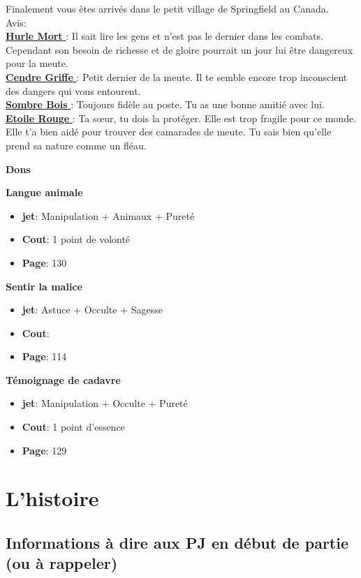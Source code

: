 \documentclass[oneside,12pt]{book}
\newcommand\don[5]{
\textbf{#1} \\
#2
\begin{itemize}
\item{ \textbf{jet}: #3}
\item{ \textbf{Cout}: #4}
\item{ \textbf{Page}: #5}
\end{itemize}
\vspace{0.5cm}
}
\newcommand{\Lynn}{\textbf{Etoile Rouge} }
\newcommand{\Luke}{\textbf{Cendre Griffe} }
\newcommand{\Peter}{\textbf{Hurle Mort} }
\newcommand{\Leonard}{\textbf{Sombre Bois} }
\begin{document}
\begin{flushleft}
\begin{description}
{Finalement vous êtes arrivés dans le petit village de Springfield au Canada.  \\
Avis:\\
\underline{\Peter} : Il sait lire les gens et n'est pas le dernier dans les combats. Cependant son besoin de richesse et de gloire pourrait un jour lui être dangereux pour la meute. \\
\underline{\Luke} : Petit dernier de la meute. Il te semble encore trop inconscient des dangers qui vous entourent.\\
\underline{\Leonard} : Toujours fidèle au poste. Tu as une bonne amitié avec lui.\\
\underline{\Lynn}: Ta sœur, tu dois la protéger. Elle est trop fragile pour ce monde. Elle t'a bien aidé pour trouver des camarades de meute. Tu sais bien qu'elle prend sa nature comme un fléau.\\
}
\end{description}
\clearpage
\textbf{\large Dons} 
\vspace{0.5cm}

\don{Langue animale}{}{Manipulation + Animaux + Pureté}{1 point de volonté}{130}
\don{Sentir la malice}{}{Astuce + Occulte + Sagesse}{}{114}
\don{Témoignage de cadavre}{}{Manipulation + Occulte + Pureté}{1 point d'essence}{129}

\chapter{L'histoire}
\section{Informations à dire aux PJ en début de partie  (ou à rappeler) }

\end{flushleft}
\end{document}
